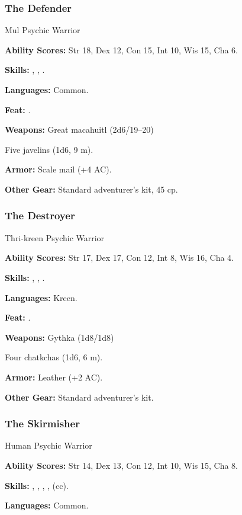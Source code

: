\subsubsection{The Defender}

Mul Psychic Warrior

\textbf{Ability Scores:} Str 18, Dex 12, Con 15, Int 10, Wis 15, Cha 6.

\textbf{Skills:} , , .

\textbf{Languages:} Common.

\textbf{Feat:} .

\textbf{Weapons:} Great macahuitl (2d6/19--20)

Five javelins (1d6, 9 m).

\textbf{Armor:} Scale mail (+4 AC).

\textbf{Other Gear:} Standard adventurer's kit, 45 cp.

\subsubsection{The Destroyer}

Thri-kreen Psychic Warrior

\textbf{Ability Scores:} Str 17, Dex 17, Con 12, Int 8, Wis 16, Cha 4.

\textbf{Skills:} , , .

\textbf{Languages:} Kreen.

\textbf{Feat:} .

\textbf{Weapons:} Gythka (1d8/1d8)

Four chatkchas (1d6, 6 m).

\textbf{Armor:} Leather (+2 AC).

\textbf{Other Gear:} Standard adventurer's kit.

\subsubsection{The Skirmisher}

Human Psychic Warrior

\textbf{Ability Scores:} Str 14, Dex 13, Con 12, Int 10, Wis 15, Cha 8.

\textbf{Skills:} , , , ,  (cc).

\textbf{Languages:} Common.


